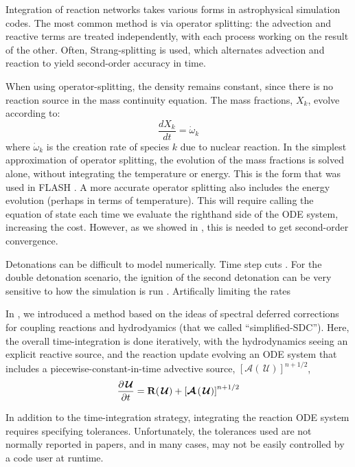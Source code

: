 \documentclass[linenumbers,trackchanges]{aastex631}
\newcommand{\omegadot}{\dot{\omega}}
\newcommand{\ddt}[1]{{\frac{{\partial#1}}{\partial t}}}
\newcommand{\Uc}{{\,\bm{\mathcal{U}}}}
\newcommand{\Rb}{{\bf R}}
\newcommand{\Adv}[1]{{\left [\boldsymbol{\mathcal{A}} \left(#1\right)\right]}}
\newcommand{\MarginPar}[1]{
    \marginpar{\vskip-\baselineskip%
               \raggedright%
               \tiny\sffamily%
               {\color{red}\hrule%
               \smallskip%
               #1\par%
               \smallskip%
               \hrule}}%
}
\begin{document}
Integration of reaction networks takes various forms in astrophysical
simulation codes.  The most common method is via operator splitting:
the advection and reactive terms are treated independently, with each
process working on the result of the other.  Often, Strang-splitting
\citep{strang:1968} is used, which alternates advection and reaction
to yield second-order accuracy in time.

When using operator-splitting, the density remains constant, since there
is no reaction source in the mass continuity equation.  The mass
fractions, $X_k$, evolve according to:
\begin{equation}
\frac{dX_k}{dt} = \omegadot_k
\end{equation}
where $\omegadot_k$ is the creation rate of species $k$ due to nuclear
reaction.  In the simplest approximation of operator splitting, the
evolution of the mass fractions is solved alone, without integrating
the temperature or energy.  This is the form that was used in FLASH
\cite{flash}.  A more accurate operator splitting also includes the
energy evolution (perhaps in terms of temperature).  This will require
calling the equation of state each time we evaluate the righthand side
of the ODE system, increasing the cost.  However, as we showed in
\citet{strang_rnaas}, this is needed to get second-order convergence.

Detonations can be difficult to model numerically.  Time step cuts \MarginPar{ref}.
For the double detonation scenario, the ignition of the second detonation
can be very sensitive to how the simulation is run \MarginPar{refs}.
Artifically limiting the rates \MarginPar{ref}

In \citet{castro_simple_sdc}, we introduced a method based on the
ideas of spectral deferred corrections for coupling reactions and
hydrodyamics (that we called ``simplified-SDC'').  Here, the overall
time-integration is done iteratively, with the hydrodynamics seeing an
explicit reactive source, and the reaction update evolving an ODE
system that includes a piecewise-constant-in-time advective source,
$\Adv{\Uc}^{n+1/2}$,
\begin{equation}
\ddt{\Uc} = \Rb(\Uc) + \Adv{\Uc}^{n+1/2}
\end{equation}

In addition to the time-integration strategy, integrating the reaction
ODE system requires specifying tolerances.  Unfortunately, the tolerances
used are not normally reported in papers, and in many cases, may not
be easily controlled by a code user at runtime.
\end{document}
